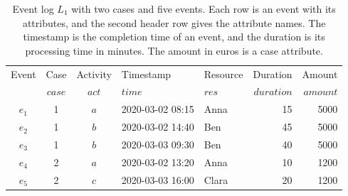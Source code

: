 \begin{table}[tb]
	\centering
	\caption[Example event log table]{%
		Event log $L_1$ with two cases and five events. Each row is an event with its attributes, and the second header row gives the attribute names. The timestamp is the completion time of an event, and the duration is its processing time in minutes. The amount in euros is a case attribute.}
	\label{tab:prelim:example_log}
	\begin{tabular}{@{}cccllrr@{}}
		\toprule
		Event    & Case            & Activity       & Timestamp        & Resource       & Duration            & Amount            \\
		         & $\mathit{case}$ & $\mathit{act}$ & $\mathit{time}$  & $\mathit{res}$ & $\mathit{duration}$ & $\mathit{amount}$ \\
		\midrule
		$e_1$    & 1               & $a$            & 2020-03-02 08:15 & Anna           & 15                  & 5000              \\
		$e_2$    & 1               & $b$            & 2020-03-02 14:40 & Ben            & 45                  & 5000              \\
		$e_3$    & 1               & $b$            & 2020-03-03 09:30 & Ben            & 40                  & 5000              \\
		\addlinespace
		$e_4$    & 2               & $a$            & 2020-03-02 13:20 & Anna           & 10                  & 1200              \\
		$e_5$    & 2               & $c$            & 2020-03-03 16:00 & Clara          & 20                  & 1200              \\
		\bottomrule
	\end{tabular}
\end{table}


